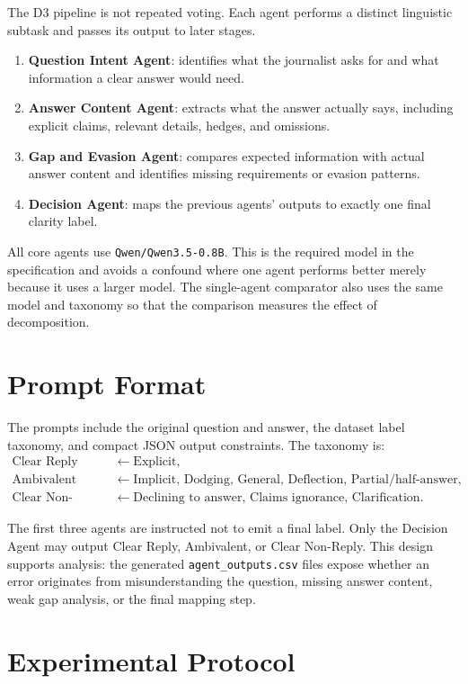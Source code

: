 \documentclass[12pt]{fphw}
\newcommand{\CR}{Clear Reply}
\newcommand{\AMB}{Ambivalent}
\newcommand{\CNR}{Clear Non-Reply}
\begin{document}
The D3 pipeline is not repeated voting. Each agent performs a distinct linguistic subtask and passes its output to later stages.

\begin{enumerate}
    \item \textbf{Question Intent Agent}: identifies what the journalist asks for and what information a clear answer would need.
    \item \textbf{Answer Content Agent}: extracts what the answer actually says, including explicit claims, relevant details, hedges, and omissions.
    \item \textbf{Gap and Evasion Agent}: compares expected information with actual answer content and identifies missing requirements or evasion patterns.
    \item \textbf{Decision Agent}: maps the previous agents' outputs to exactly one final clarity label.
\end{enumerate}

All core agents use \texttt{Qwen/Qwen3.5-0.8B}. This is the required model in the specification and avoids a confound where one agent performs better merely because it uses a larger model. The single-agent comparator also uses the same model and taxonomy so that the comparison measures the effect of decomposition.

\section{Prompt Format}

The prompts include the original question and answer, the dataset label taxonomy, and compact JSON output constraints. The taxonomy is:
\[
\begin{aligned}
\text{\CR} &\leftarrow \text{Explicit}, \\
\text{\AMB} &\leftarrow \text{Implicit, Dodging, General, Deflection, Partial/half-answer}, \\
\text{\CNR} &\leftarrow \text{Declining to answer, Claims ignorance, Clarification}.
\end{aligned}
\]

The first three agents are instructed not to emit a final label. Only the Decision Agent may output \CR, \AMB, or \CNR. This design supports analysis: the generated \texttt{agent\_outputs.csv} files expose whether an error originates from misunderstanding the question, missing answer content, weak gap analysis, or the final mapping step.

\section{Experimental Protocol}
\end{document}
